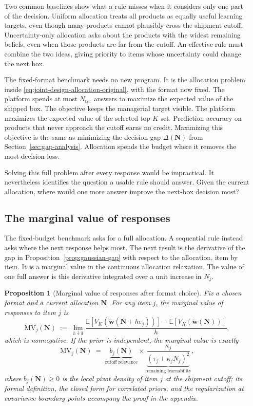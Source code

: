 \documentclass[11pt]{article}
\newtheorem{proposition}[theorem]{Proposition}
\theoremstyle{definition}
\theoremstyle{remark}
\newcommand{\E}{\mathbb{E}}
\newcommand{\1}{\mathbf{1}}
\newcommand{\w}{\mathbf{w}}
\newcommand{\N}{\mathbf{N}}
\begin{document}
Two common baselines show what a rule misses when it considers only one
part of the decision. Uniform
allocation treats all products as equally useful learning targets, even
though many products cannot plausibly cross the shipment cutoff.
Uncertainty-only allocation asks about the products with the widest
remaining beliefs, even when those products are far from the cutoff. An
effective rule must combine the two ideas, giving priority to items whose
uncertainty could change the next box.

The fixed-format benchmark needs no new program. It is the allocation
problem inside \eqref{eq:joint-design-allocation-original}, with the
format now fixed. The platform spends at most \(N_{\mathrm{tot}}\)
answers to maximize the expected value of the shipped box. The objective keeps the managerial target visible. The platform
maximizes the expected value of the selected top-\(K\) set. Prediction
accuracy on products that never approach the cutoff earns no credit.
Maximizing this objective is the same as minimizing the decision gap \(\Delta(\N)\)
from Section~\ref{sec:gap-analysis}. Allocation spends the budget where
it removes the most decision loss.

Solving this full problem after every response would be impractical. It
nevertheless identifies the question a usable rule should answer. Given
the current allocation, where would one more answer improve the next-box
decision most?

\subsection{The marginal value of responses}
\label{subsec:alloc-local-value}
\label{subsec:alloc-diagonal-rule}

The fixed-budget benchmark asks for a full allocation. A sequential rule
instead asks where the next response helps most. The next result is the
derivative of the gap in Proposition~\ref{prop:gaussian-gap} with
respect to the allocation, item by item. It is a marginal value in the
continuous allocation relaxation. The value of one full answer is this
derivative integrated over a unit increase in \(N_j\).

\begin{proposition}[Marginal value of responses after format choice]
\label{prop:local-marginal}
Fix a chosen format and a current allocation \(\N\). For any item \(j\),
the marginal value of responses to item \(j\) is
\[
\mathrm{MV}_j(\N)
\;:=\;
\lim_{h\downarrow0}
\frac{\E[V_K(\tilde{\w}(\N+h e_j))]
-\E[V_K(\tilde{\w}(\N))]}{h},
\]
which is nonnegative. If the prior is independent, the marginal value
is exactly
\begin{equation}
\mathrm{MV}_j(\N)
\;=\;
\underbrace{b_j(\N)}_{\text{cutoff relevance}}
\times
\underbrace{\frac{\kappa_j}{(\tau_j+\kappa_jN_j)^2}}_{\text{remaining learnability}},
\label{eq:priority-decomposition}
\end{equation}
where \(b_j(\N)\ge0\) is the local pivot density of item \(j\) at the
shipment cutoff; its formal definition, the closed form for correlated
priors, and the regularization at covariance-boundary points accompany
the proof in the appendix.
\end{proposition}
\end{document}
